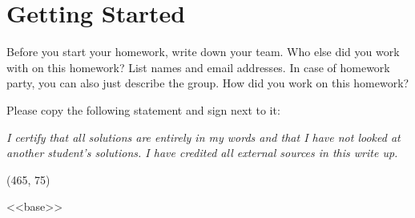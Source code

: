 \documentclass[11pt]{article}
\begin{document}
\maketitle
\fontsize{12}{15}\selectfont

\section{Getting Started}
Before you start your homework, write down your team. Who else did you work with on this homework? List names and email addresses. In case of homework party, you can also just describe the group. How did you work on this homework?

Please copy the following statement and sign next to it:

\textit{I certify that all solutions are entirely in my words and that I have not looked at another student's solutions. I have credited all external sources in this write up.}

\vspace{15pt}
\framebox(465, 75){}

<<base>>
\end{document}
